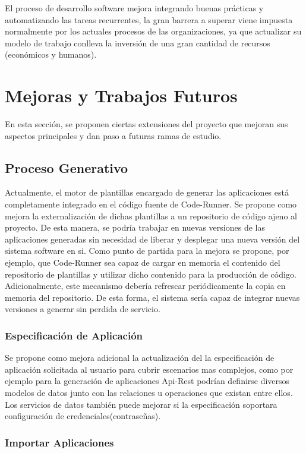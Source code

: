 \documentclass[a4paper,11pt]{book}
\begin{document}
 El proceso de desarrollo software mejora integrando buenas prácticas y automatizando las tareas recurrentes, la gran barrera a superar viene impuesta normalmente por los actuales procesos de las organizaciones, ya que actualizar su modelo de trabajo conlleva la inversión de una gran cantidad de recursos (económicos y humanos).

\section{Mejoras y Trabajos Futuros}

En esta sección, se proponen ciertas extensiones del proyecto que mejoran sus aspectos principales y dan paso a futuras ramas de estudio. 

\subsection{Proceso Generativo}

Actualmente, el motor de plantillas encargado de generar las aplicaciones está completamente integrado en el código fuente de Code-Runner. Se propone como mejora la externalización de dichas plantillas a un repositorio de código ajeno al proyecto. De esta manera, se podría trabajar en nuevas versiones de las aplicaciones generadas sin necesidad de liberar y desplegar una nueva versión del sistema software en si. Como punto de partida para la mejora se propone, por ejemplo, que Code-Runner sea capaz de cargar en memoria el contenido del repositorio de plantillas y utilizar dicho contenido para la producción de código. Adicionalmente, este mecanismo debería refrescar periódicamente la copia en memoria del repositorio. De esta forma, el sistema sería capaz de integrar nuevas versiones a generar sin perdida de servicio. 
\subsubsection{Especificación de Aplicación}

Se propone como mejora adicional la actualización del la especificación de aplicación solicitada al usuario para cubrir escenarios mas complejos, como por ejemplo para la  generación de aplicaciones  Api-Rest podrían definirse diversos modelos de datos junto con las relaciones u operaciones que existan entre ellos. Los servicios de datos también puede mejorar si la especificación soportara configuración de credenciales(contraseñas).

\subsubsection{Importar Aplicaciones}
\end{document}
